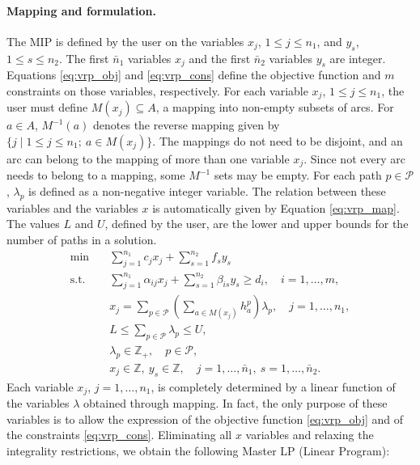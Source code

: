 \documentclass[3p, authoryear, 11pt]{elsarticle}
\begin{document}
\paragraph{Mapping and formulation.} The MIP is defined by the user on the variables $x_j$, $1\le j\le n_1$, and $y_s$, $1\le s\le n_2$. The first $\bar{n}_1$ variables $x_j$ and the first $\bar{n}_2$ variables $y_s$ are integer. Equations \eqref{eq:vrp_obj} and \eqref{eq:vrp_cons} define the objective function and $m$ constraints on those variables, respectively. For each variable $x_j$, $1\le j\le n_1$, the user must define $M(x_j)\subseteq A$, a mapping into non-empty subsets of arcs. For $a\in A$, $M^{-1}(a)$ denotes the reverse mapping given by $\{j\mid 1\le j\le n_1;\ a\in M(x_j)\}$. The mappings do not need to be disjoint, and an arc can belong to the mapping of more than one variable $x_j$. Since not every arc needs to belong to a mapping, some $M^{-1}$ sets may be empty. For each path $p\in \mathcal{P}$, $\lambda_p$ is defined as a non-negative integer variable. The relation between these variables and the variables $x$ is automatically given by Equation \eqref{eq:vrp_map}. The values $L$ and $U$, defined by the user, are the lower and upper bounds for the number of paths in a solution.
\begin{align}
\min \quad & \sum_{j=1}^{n_1} c_j x_j + \sum_{s=1}^{n_2} f_s y_s \label{eq:vrp_obj}\\
\text{s.t.}\quad & \sum_{j=1}^{n_1} \alpha_{ij}x_j + \sum_{s=1}^{n_2} \beta_{is}y_s \ge d_i, \quad i=1,\ldots,m, \label{eq:vrp_cons}\\
& x_j = \sum_{p\in \mathcal{P}} \left( \sum_{a\in M(x_j)} h_a^p \right) \lambda_p, \quad j=1,\ldots,n_1, \label{eq:vrp_map}\\
& L \le \sum_{p\in \mathcal{P}} \lambda_p \le U, \label{eq:vrp_bounds}\\
& \lambda_p \in \mathbb{Z}_+, \quad p\in \mathcal{P}, \label{eq:vrp_lambda}\\
& x_j \in \mathbb{Z},\ y_s \in \mathbb{Z}, \quad j=1,\ldots,\bar{n}_1,\ s=1,\ldots,\bar{n}_2. \label{eq:vrp_int}
\end{align}
Each variable $x_j$, $j=1,\ldots,n_1$, is completely determined by a linear function of the variables $\lambda$ obtained through mapping. In fact, the only purpose of these variables is to allow the expression of the objective function \eqref{eq:vrp_obj} and of the constraints \eqref{eq:vrp_cons}. Eliminating all $x$ variables and relaxing the integrality restrictions, we obtain the following Master LP (Linear Program):
\end{document}
